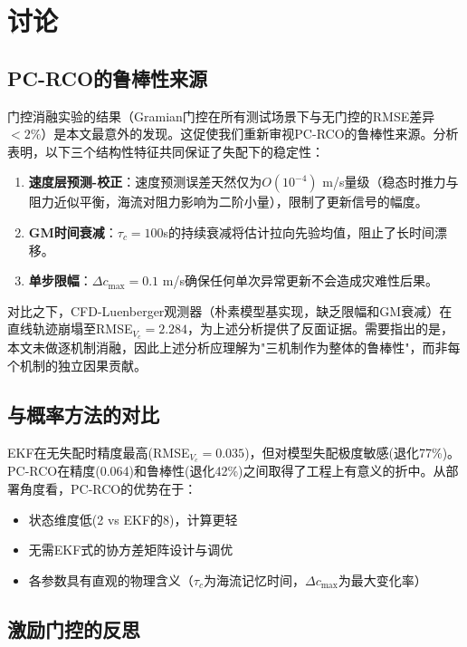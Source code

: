 \section{讨论}

\subsection{PC-RCO的鲁棒性来源}

门控消融实验的结果（Gramian门控在所有测试场景下与无门控的RMSE差异$<2\%$）是本文最意外的发现。这促使我们重新审视PC-RCO的鲁棒性来源。分析表明，以下三个结构性特征共同保证了失配下的稳定性：

\begin{enumerate}
    \item \textbf{速度层预测-校正}：速度预测误差天然仅为$O(10^{-4})$ m/s量级（稳态时推力与阻力近似平衡，海流对阻力影响为二阶小量），限制了更新信号的幅度。
    \item \textbf{GM时间衰减}：$\tau_c=100$s的持续衰减将估计拉向先验均值，阻止了长时间漂移。
    \item \textbf{单步限幅}：$\Delta c_{\max}=0.1$ m/s确保任何单次异常更新不会造成灾难性后果。
\end{enumerate}

对比之下，CFD-Luenberger观测器（朴素模型基实现，缺乏限幅和GM衰减）在直线轨迹崩塌至RMSE$_{V_c}=2.284$，为上述分析提供了反面证据。需要指出的是，本文未做逐机制消融，因此上述分析应理解为"三机制作为整体的鲁棒性"，而非每个机制的独立因果贡献。

\subsection{与概率方法的对比}

EKF在无失配时精度最高(RMSE$_{V_c}=0.035$)，但对模型失配极度敏感(退化77\%)。PC-RCO在精度(0.064)和鲁棒性(退化42\%)之间取得了工程上有意义的折中。从部署角度看，PC-RCO的优势在于：
\begin{itemize}
    \item 状态维度低(2 vs EKF的8)，计算更轻
    \item 无需EKF式的协方差矩阵设计与调优
    \item 各参数具有直观的物理含义（$\tau_c$为海流记忆时间，$\Delta c_{\max}$为最大变化率）
\end{itemize}

\subsection{激励门控的反思}

